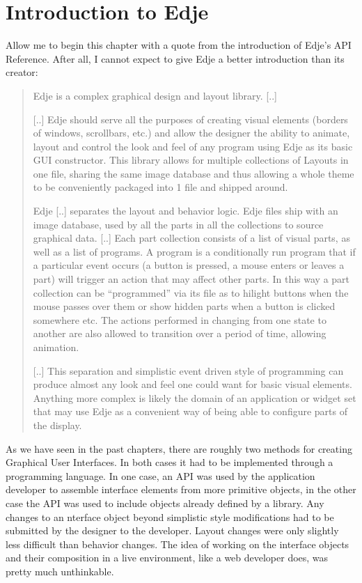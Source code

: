 \documentclass[12pt,a4paper,english]{book}
\begin{document}

\hypertarget{introduction-to-edje}{}
\section{Introduction to Edje}
\label{introduction-to-edje}

Allow me to begin this chapter with a quote from the introduction of Edje's API
Reference. After all, I cannot expect to give Edje a better introduction than
its creator:
\begin{quote}

Edje is a complex graphical design and layout library. {[}..{]}

{[}..{]} Edje should serve all the purposes of creating visual elements
(borders of windows, scrollbars, etc.) and allow the designer the ability
to animate, layout and control the look and feel of any program using Edje
as its basic GUI constructor. This library allows for multiple collections
of Layouts in one file, sharing the same image database and thus allowing a
whole theme to be conveniently packaged into 1 file and shipped around.

Edje {[}..{]} separates the layout and behavior logic. Edje files ship with an
image database, used by all the parts in all the collections to source
graphical data. {[}..{]} Each part collection consists of a list of visual
parts, as well as a list of programs. A program is a conditionally run
program that if a particular event occurs (a button is pressed, a mouse
enters or leaves a part) will trigger an action that may affect other
parts. In this way a part collection can be ``programmed'' via its file as to
hilight buttons when the mouse passes over them or show hidden parts when a
button is clicked somewhere etc. The actions performed in changing from one
state to another are also allowed to transition over a period of time,
allowing animation.

{[}..{]} This separation and simplistic event driven style of programming can
produce almost any look and feel one could want for basic visual elements.
Anything more complex is likely the domain of an application or widget set
that may use Edje as a convenient way of being able to configure parts of
the display.
\end{quote}

As we have seen in the past chapters, there are roughly two methods for
creating Graphical User Interfaces. In both cases it had to be implemented
through a programming language. In one case, an API was used by the application
developer to assemble interface elements from more primitive objects, in the
other case the API was used to include objects already defined by a library.
Any changes to an nterface object beyond simplistic style modifications had to
be submitted by the designer to the developer. Layout changes were only
slightly less difficult than behavior changes. The idea of working on the
interface objects and their composition in a live environment, like a web
developer does, was pretty much unthinkable.
\end{document}
